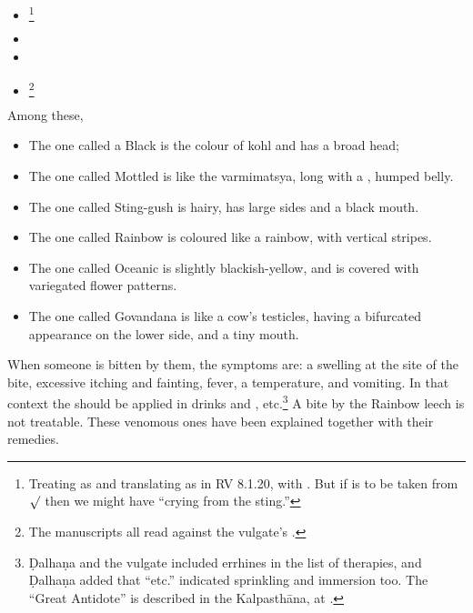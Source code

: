 \begin{translation}
\begin{itemize}
    \item {}\footnote{Treating  as
     and translating as in RV 8.1.20, with \citet[1023, verse 20
    and cf.\ commentary]{jami-2014}. But if  is to be taken from
    $\surd$ then we might have “crying from the sting.”}
    
    \item {} 
    
    \item {} \item
{}\footnote{The manuscripts all read
     against the vulgate's .}
\end{itemize}

Among these, 
\begin{itemize}
    \item The one called a Black is the colour of kohl and has a broad head;

    \item The one called Mottled is like the \gls{varmimatsya}, long with a
, humped belly.
    
    \item  The one called Sting-gush is hairy, has large sides and a black mouth.
    
    \item  The one called Rainbow is coloured like a rainbow, with vertical stripes.
    
    \item  The one called Oceanic is slightly blackish-yellow, and is covered with
    variegated flower patterns. 
    
    \item The one called Govandana is like a cow's testicles, having a bifurcated 
    appearance on the lower side, and a tiny mouth. 
       
\end{itemize}
When someone is bitten by them, the symptoms are: a swelling at the site of 
the
bite, excessive itching and fainting, fever, a temperature, and vomiting. In
that context the  should be applied in drinks 
and
, etc.\footnote{Ḍalhaṇa and the vulgate included 
errhines
    in the list of therapies, and Ḍalhaṇa added that “etc.” indicated sprinkling and
    immersion too.   The “Great Antidote” is described in the Kalpasthāna, at
    .} A bite by the Rainbow leech is not treatable.  
    These
    venomous ones have been explained together with their remedies.


\end{translation}
